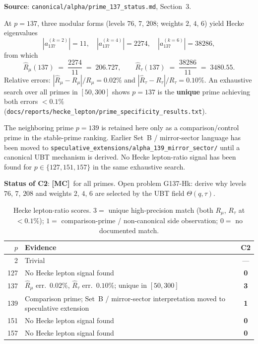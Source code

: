 \documentclass[12pt,a4paper]{article}
\theoremstyle{definition}
\theoremstyle{remark}
\newcommand{\MC}{\textbf{[MC]}}
\begin{document}
\textbf{Source}: \texttt{canonical/alpha/prime\_137\_status.md}, Section~3.

At $p = 137$, three modular forms (levels $76$, $7$, $208$;
weights $2$, $4$, $6$) yield Hecke eigenvalues
\begin{equation}
  |a_{137}^{(k=2)}| = 11,\quad
  |a_{137}^{(k=4)}| = 2274,\quad
  |a_{137}^{(k=6)}| = 38286,
  \label{eq:spr:hecke137}
\end{equation}
from which
\[
  \hat{R}_\mu(137) \;=\; \frac{2274}{11} \;=\; 206.727,\qquad
  \hat{R}_\tau(137) \;=\; \frac{38286}{11} \;=\; 3480.55.
\]
Relative errors: $|\hat{R}_\mu - R_\mu|/R_\mu = 0.02\%$ and
$|\hat{R}_\tau - R_\tau|/R_\tau = 0.10\%$.
An exhaustive search over all primes in $[50, 300]$ shows $p = 137$ is the
\textbf{unique} prime achieving both errors $< 0.1\%$
(\texttt{docs/reports/hecke\_lepton/prime\_specificity\_results.txt}).

The neighboring prime $p = 139$ is retained here only as a comparison/control
prime in the stable-prime ranking.  Earlier Set~B / mirror-sector language has
been moved to \texttt{speculative\_extensions/alpha\_139\_mirror\_sector/}
until a canonical UBT mechanism is derived.  No Hecke lepton-ratio signal has
been found for $p \in \{127, 151, 157\}$ in the same exhaustive search.

\textbf{Status of C2}: \MC\ for all primes.
Open problem G137-Hk: derive why levels $76$, $7$, $208$ and weights
$2$, $4$, $6$ are selected by the UBT field $\Theta(q, \tau)$.

\begin{table}[h]
\centering
\caption{Hecke lepton-ratio scores.
  $3 =$ unique high-precision match (both $R_\mu$, $R_\tau$ at $< 0.1\%$);
  $1 =$ comparison-prime / non-canonical side observation;
  $0 =$ no documented match.}
\label{tab:spr:c2}
\begin{tabular}{rp{7.8cm}c}
\toprule
$p$ & Evidence & \textbf{C2} \\
\midrule
  2 & Trivial & — \\
127 & No Hecke lepton signal found & \textbf{0} \\
137 & $\hat{R}_\mu$ err.\ $0.02\%$, $\hat{R}_\tau$ err.\ $0.10\%$; unique in $[50,300]$ & \textbf{3} \\
139 & Comparison prime; Set~B / mirror-sector interpretation moved to speculative extension & \textbf{1} \\
151 & No Hecke lepton signal found & \textbf{0} \\
157 & No Hecke lepton signal found & \textbf{0} \\
\bottomrule
\end{tabular}
\end{table}
\end{document}
